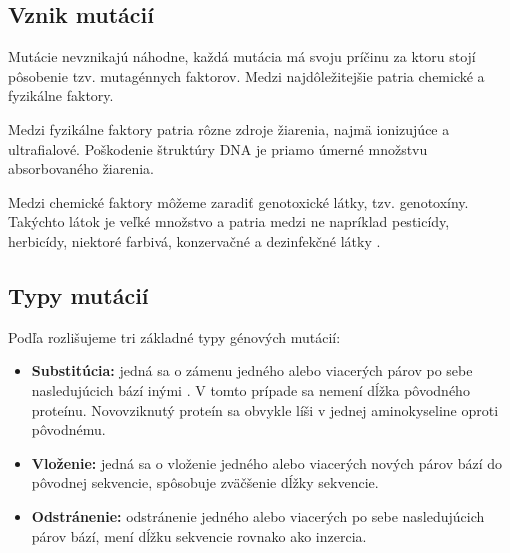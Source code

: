 \subsection{Vznik mutácií}

Mutácie nevznikajú náhodne, každá mutácia má svoju príčinu za ktoru stojí pôsobenie tzv. mutagénnych faktorov. Medzi najdôležitejšie patria chemické a fyzikálne faktory.

Medzi fyzikálne faktory patria rôzne zdroje žiarenia, najmä ionizujúce a ultrafialové. Poškodenie štruktúry DNA je priamo úmerné množstvu absorbovaného žiarenia.

Medzi chemické faktory môžeme zaradiť genotoxické látky, tzv. genotoxíny. Takýchto látok je veľké množstvo a patria medzi ne napríklad pesticídy, herbicídy, niektoré farbivá, konzervačné a dezinfekčné látky \cite{mutace}. 

\subsection{Typy mutácií}

Podľa \cite{flegr} rozlišujeme tri základné typy génových mutácií:
\begin{itemize}
	\item \textbf{Substitúcia:} jedná sa o zámenu jedného alebo viacerých párov po sebe nasledujúcich bází inými \cite{mutace}. V tomto prípade sa nemení dĺžka pôvodného proteínu. Novovziknutý proteín sa obvykle líši v jednej aminokyseline oproti pôvodnému. 
	\item \textbf{Vloženie:} jedná sa o vloženie jedného alebo viacerých nových párov bází do pôvodnej sekvencie, spôsobuje zväčšenie dĺžky sekvencie.
	\item \textbf{Odstránenie:} odstránenie jedného alebo viacerých po sebe nasledujúcich párov bází, mení dĺžku sekvencie rovnako ako inzercia.
\end{itemize}

